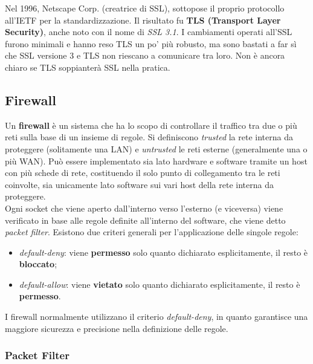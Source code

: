         Nel 1996, Netscape Corp. (creatrice di SSL), sottopose il proprio protocollo all’IETF per la
        standardizzazione. Il risultato fu \textbf{TLS (Transport Layer Security)}, anche noto con il nome di
        \emph{SSL 3.1}. I cambiamenti operati all’SSL furono minimali e hanno reso TLS un po’ più robusto, ma
        sono bastati a far sì che SSL versione 3 e TLS non riescano a comunicare tra loro. Non è ancora
        chiaro se TLS soppianterà SSL nella pratica.

    \subsection{Firewall}

        Un \textbf{firewall} è un sistema che ha lo scopo di controllare il traffico tra due o più reti sulla base di
        un insieme di regole. Si definiscono \emph{trusted} la rete interna da proteggere (solitamente una LAN)
        e \emph{untrusted} le reti esterne (generalmente una o più WAN). Può essere implementato sia lato
        hardware e software tramite un host con più schede di rete, costituendo il solo punto di
        collegamento tra le reti coinvolte, sia unicamente lato software sui vari host della rete interna
        da proteggere.\\

        Ogni socket che viene aperto dall’interno verso l’esterno (e viceversa) viene verificato in base
        alle regole definite all’interno del software, che viene detto \emph{packet filter}. Esistono due criteri
        generali per l’applicazione delle singole regole:

        \begin{itemize}
            \item \emph{default-deny}: viene \textbf{permesso} solo quanto dichiarato esplicitamente, il resto è \textbf{bloccato};
            \item \emph{default-allow}: viene \textbf{vietato} solo quanto dichiarato esplicitamente, il resto è \textbf{permesso}.
        \end{itemize}

        I firewall normalmente utilizzano il criterio \emph{default-deny}, in quanto garantisce una maggiore
        sicurezza e precisione nella definizione delle regole.

        \subsubsection{Packet Filter}

